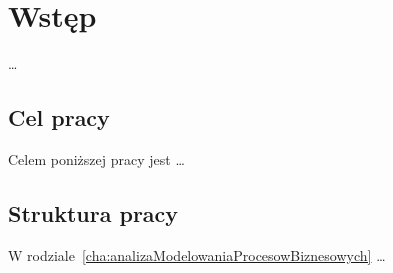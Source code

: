 \chapter{Wstęp}
\label{cha:wstep}

\dots

\section{Cel pracy}
\label{sec:celePracy}


Celem poniższej pracy jest \dots


\section{Struktura pracy}
\label{sec:strukturaPracy}

W rodziale~\ref{cha:analizaModelowaniaProcesowBiznesowych} \dots